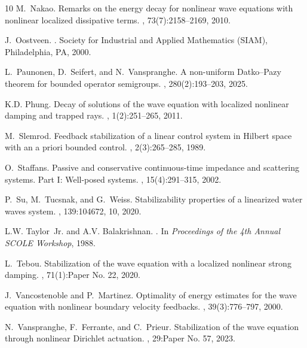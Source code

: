 \documentclass[11pt, a4paper]{amsart}
\theoremstyle{definition}
\numberwithin{equation}{section}
\begin{document}
\begin{thebibliography}{10}
M.~Nakao.
\newblock Remarks on the energy decay for nonlinear wave equations with
  nonlinear localized dissipative terms.
, 73(7):2158--2169, 2010.

J.~Oostveen.
.
\newblock Society for Industrial and Applied Mathematics (SIAM), Philadelphia,
  PA, 2000.

L.~Paunonen, D.~Seifert, and N.~Vanspranghe.
\newblock A non-uniform {D}atko--{P}azy theorem for bounded operator
  semigroups.
, 280(2):193--203, 2025.

K.D. Phung.
\newblock Decay of solutions of the wave equation with localized nonlinear
  damping and trapped rays.
, 1(2):251--265, 2011.

M.~Slemrod.
\newblock Feedback stabilization of a linear control system in {H}ilbert space
  with an a priori bounded control.
, 2(3):265--285, 1989.

O.~Staffans.
\newblock Passive and conservative continuous-time impedance and scattering
  systems. {Part I}: {W}ell-posed systems.
, 15(4):291--315, 2002.

P.~Su, M.~Tucsnak, and G.~Weiss.
\newblock Stabilizability properties of a linearized water waves system.
, 139:104672, 10, 2020.

L.W. Taylor~Jr. and A.V. Balakrishnan.
.
\newblock In {\em Proceedings of the 4th Annual SCOLE Workshop}, 1988.

L.~Tebou.
\newblock Stabilization of the wave equation with a localized nonlinear strong
  damping.
, 71(1):Paper No. 22, 2020.

J.~Vancostenoble and P.~Martinez.
\newblock Optimality of energy estimates for the wave equation with nonlinear
  boundary velocity feedbacks.
, 39(3):776--797, 2000.

N.~Vanspranghe, F.~Ferrante, and C.~Prieur.
\newblock Stabilization of the wave equation through nonlinear {D}irichlet
  actuation.
, 29:Paper No. 57, 2023.


\end{thebibliography}
\end{document}
